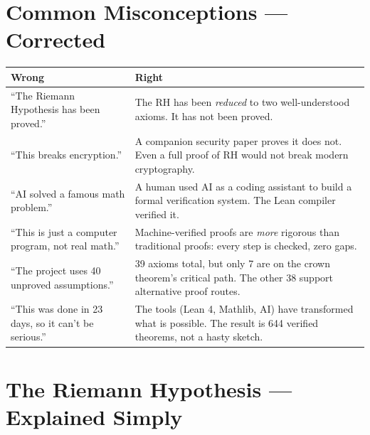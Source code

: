 \documentclass[11pt,a4paper]{article}
\begin{document}
\section{Common Misconceptions --- Corrected}

\begin{center}
\small
\begin{tabular}{@{}p{6cm}p{6.5cm}@{}}
\toprule
\textcolor{wrong}{\textbf{Wrong}} &
\textcolor{correct}{\textbf{Right}} \\
\midrule
``The Riemann Hypothesis has been proved.'' &
The RH has been \emph{reduced} to two well-understood
axioms. It has not been proved. \\[6pt]

``This breaks encryption.'' &
A companion security paper proves it does not. Even
a full proof of RH would not break modern cryptography. \\[6pt]

``AI solved a famous math problem.'' &
A human used AI as a coding assistant to build a formal
verification system. The Lean compiler verified it. \\[6pt]

``This is just a computer program, not real math.'' &
Machine-verified proofs are \emph{more} rigorous than
traditional proofs: every step is checked, zero gaps. \\[6pt]

``The project uses 40 unproved assumptions.'' &
39 axioms total, but only 7 are on the crown theorem's
critical path. The other 38 support alternative proof
routes. \\[6pt]

``This was done in 23 days, so it can't be serious.'' &
The tools (Lean 4, Mathlib, AI) have transformed what
is possible. The result is 644 verified theorems, not
a hasty sketch.  \\
\bottomrule
\end{tabular}
\end{center}

\section{The Riemann Hypothesis --- Explained Simply}
\end{document}
